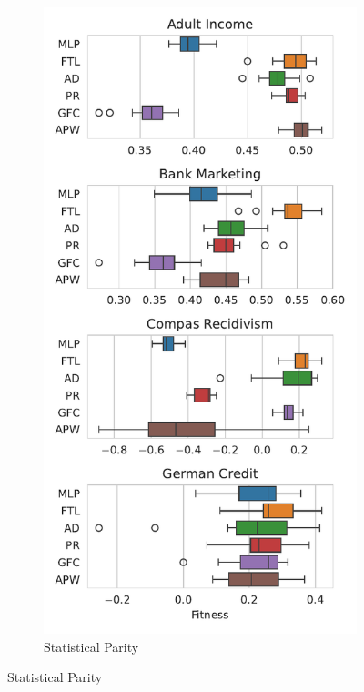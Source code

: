 \begin{figure}[!ht]
\centering
\caption{Fitness values optimizing MCC and multiple fairness metrics.}
\begin{subfigure}{.32\linewidth}
    \caption{Statistical Parity}
    \label{fig:boxplot_mcc_parity}
    \includegraphics[width=1\linewidth]{images/boxplot_mcc_parity.pdf}

\end{subfigure}
\end{figure}
